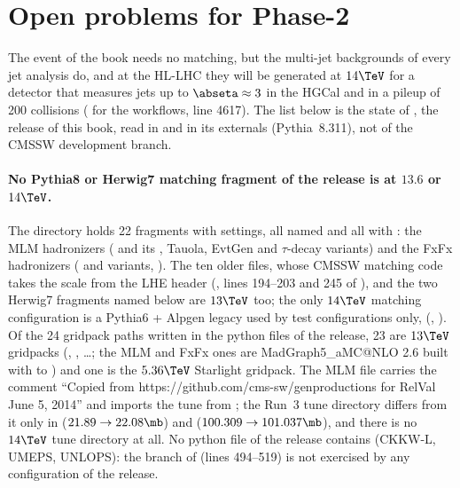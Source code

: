 \FloatBarrier

\section{Open problems for Phase-2}

The event of the book needs no matching, but the multi-jet backgrounds of every jet analysis do, and at the HL-LHC
they will be generated at $14\TeV$ for a detector that measures jets up to $\abseta\approx3$ in the HGCal and in a
pileup of 200 collisions ( for the  workflows,  line 4617).
The list below is the state of , the release of this book, read in
 and in its externals (Pythia~8.311), not of the CMSSW development branch.

\paragraph{No Pythia8 or Herwig7 matching fragment of the release is at $13.6$ or $14\TeV$.}
The directory  holds 22 fragments with  settings, all named
 and all with : the MLM hadronizers
( and its , Tauola, EvtGen and
$\tau$-decay variants) and the FxFx hadronizers
( and variants,
). The ten older  files,
whose CMSSW matching code takes the scale from the LHE header (, lines 194--203 and 245 of
), and the two Herwig7 fragments named below are
$13\TeV$ too; the only $14\TeV$ matching configuration is a Pythia6 + Alpgen legacy used by test configurations only,
 (, ). Of the 24
gridpack paths written in the python files of the release, 23 are $13\TeV$ gridpacks (,
, \dots; the MLM and FxFx ones are MadGraph5\_aMC@NLO 2.6 built with  to
) and one is the $5.36\TeV$ Starlight gridpack. The MLM file carries the comment ``Copied from
https://github.com/cms-sw/genproductions for RelVal June 5, 2014'' and imports the tune from
; the Run~3 tune directory  differs from it
only in  ($21.89\to22.08\mb$) and  ($100.309\to101.037\mb$), and
there is no $14\TeV$ tune directory at all. No python file of the release contains  (CKKW-L, UMEPS,
UNLOPS): the  branch of  (lines 494--519) is not
exercised by any configuration of the release.

